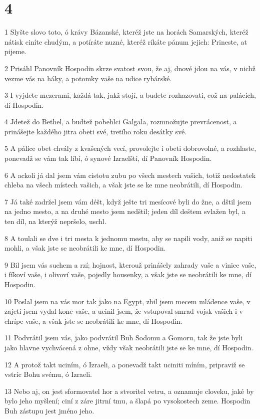 \chapter{4}

\par 1 Slyšte slovo toto, ó krávy Bázanské, kteréž jste na horách Samarských, kteréž nátisk ciníte chudým, a potíráte nuzné, kteréž ríkáte pánum jejich: Prineste, at pijeme.
\par 2 Prisáhl Panovník Hospodin skrze svatost svou, že aj, dnové jdou na vás, v nichž vezme vás na háky, a potomky vaše na udice rybárské.
\par 3 I vyjdete mezerami, každá tak, jakž stojí, a budete rozhazovati, což na palácích, dí Hospodin.
\par 4 Jdetež do Bethel, a budtež pobehlci Galgala, rozmnožujte prevrácenost, a prinášejte každého jitra obeti své, tretího roku desátky své.
\par 5 A pálíce obet chvály z kvašených vecí, provolejte i obeti dobrovolné, a rozhlaste, ponevadž se vám tak líbí, ó synové Izraelští, dí Panovník Hospodin.
\par 6 A ackoli já dal jsem vám cistotu zubu po všech mestech vašich, totiž nedostatek chleba na všech místech vašich, a však jste se ke mne neobrátili, dí Hospodin.
\par 7 Já také zadržel jsem vám déšt, když ješte tri mesícové byli do žne, a dštil jsem na jedno mesto, a na druhé mesto jsem nedštil; jeden díl deštem svlažen byl, a ten díl, na kterýž nepršelo, uschl.
\par 8 A toulali se dve i tri mesta k jednomu mestu, aby se napili vody, aniž se napiti mohli, a však jste se neobrátili ke mne, dí Hospodin.
\par 9 Bil jsem vás suchem a rzí; hojnost, kterouž prinášely zahrady vaše a vinice vaše, i fíkoví vaše, i olivoví vaše, pojedly housenky, a však jste se neobrátili ke mne, dí Hospodin.
\par 10 Poslal jsem na vás mor tak jako na Egypt, zbil jsem mecem mládence vaše, v zajetí jsem vydal kone vaše, a ucinil jsem, že vstupoval smrad vojsk vašich i v chrípe vaše, a však jste se neobrátili ke mne, dí Hospodin.
\par 11 Podvrátil jsem vás, jako podvrátil Buh Sodomu a Gomoru, tak že jste byli jako hlavne vychvácená z ohne, vždy však neobrátili jste se ke mne, dí Hospodin.
\par 12 A protož takt uciním, ó Izraeli, a ponevadž takt uciniti míním, pripraviž se vstríc Bohu svému, ó Izraeli.
\par 13 Nebo aj, on jest sformovatel hor a stvoritel vetru, a oznamuje cloveku, jaké by bylo jeho myšlení; ciní z záre jitrní tmu, a šlapá po vysokostech zeme. Hospodin Buh zástupu jest jméno jeho.

